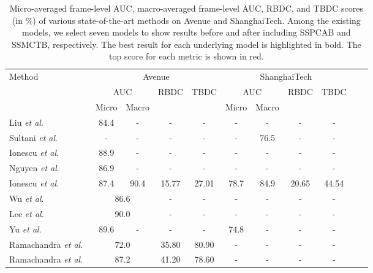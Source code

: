 \documentclass[10pt,journal,compsoc]{IEEEtran}
\newcommand{\etal}{\textit{et al}.}
\begin{document}
\begin{table*}[t]
\centering 
\caption{Micro-averaged frame-level AUC, macro-averaged frame-level AUC, RBDC, and TBDC scores (in \%) of various state-of-the-art methods on Avenue and ShanghaiTech. Among the existing models, we select seven models \cite{Barbalau-ARXIV-2022,Georgescu-TPAMI-2021,Liu-ICCV-2021,Liu-CVPR-2018,Park-CVPR-2020,He-CVPR-2022,Wang-ICDM-2022} to show results before and after including SSPCAB and SSMCTB, respectively. The best result for each underlying model is highlighted in bold. The top score for each metric is shown in red.}
\vspace{-0.2cm}
\setlength\tabcolsep{5.0pt}
\small
\begin{tabular}{| l | c | c | c | c | c | c | c | c |  c | c |} 
\hline
 \multirow{3}{*}{Method} & \multicolumn{4}{c|}{Avenue} & \multicolumn{4}{c|}{ShanghaiTech}  \\
 \cline{2-9}
 & \multicolumn{2}{c|}{AUC} & \multirow{2}{*}{RBDC} & \multirow{2}{*}{TBDC} & \multicolumn{2}{c|}{AUC} & \multirow{2}{*}{RBDC} & \multirow{2}{*}{TBDC} \\
 \cline{2-3}
 \cline{6-7}
 & Micro & Macro &  &  & Micro & Macro &  &  \\
 \hline \hline
Liu \etal~\cite{Liu-BMVC-2018} & 84.4 & - & - & - & - & - & - & - \\
Sultani \etal~\cite{Sultani-CVPR-2018} & - & - & - & - & - & 76.5 & - & -  \\
 \cline{2-3}
 \cline{6-7}
Ionescu \etal~\cite{Ionescu-WACV-2019} & 88.9 & - & - & - & - & - & - & -  \\
Nguyen \etal~\cite{Nguyen-ICCV-2019} & 86.9 & - & - & - & - & - & - & - \\
Ionescu \etal~\cite{Ionescu-CVPR-2019} & 87.4 & 90.4 & 15.77 & 27.01 & 78.7 & 84.9 & 20.65 & 44.54  \\
 \cline{2-3}
Wu \etal~\cite{Wu-TNNLS-2019} & \multicolumn{2}{c|}{86.6} & - & - & - & - & - & -  \\
Lee \etal~\cite{Lee-TIP-2019} & \multicolumn{2}{c|}{90.0} & - & - & - & - & - & - \\
\cline{2-3}
Yu \etal~\cite{Yu-ACMMM-2020} & 89.6 & - & - & - & 74.8 & - & - & -  \\
 \cline{2-3}
Ramachandra \etal~\cite{Ramachandra-WACV-2020a} & \multicolumn{2}{c|}{72.0} & 35.80 & 80.90 & - & - & - & -  \\
Ramachandra \etal~\cite{Ramachandra-WACV-2020b} & \multicolumn{2}{c|}{87.2} & 41.20 & 78.60 & - & - & - & -  \\

\end{tabular}
\end{table*}
\end{document}
